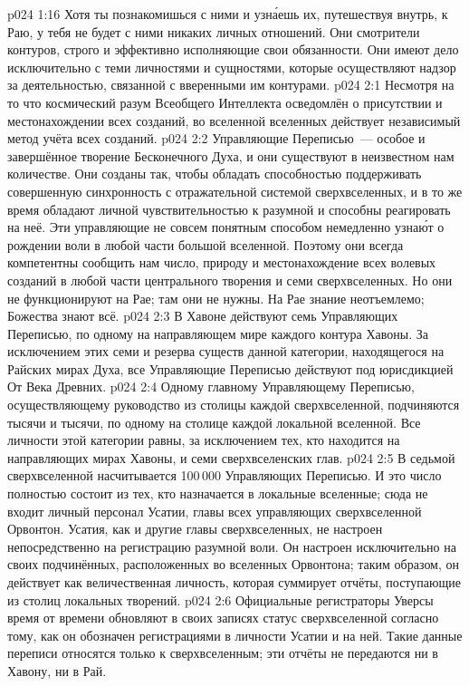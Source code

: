 \vs p024 1:16 Хотя ты познакомишься с ними и узн\'аешь их, путешествуя внутрь, к Раю, у тебя не будет с ними никаких личных отношений. Они смотрители контуров, строго и эффективно исполняющие свои обязанности. Они имеют дело исключительно с теми личностями и сущностями, которые осуществляют надзор за деятельностью, связанной с вверенными им контурами.
\vs p024 2:1 Несмотря на то что космический разум Всеобщего Интеллекта осведомлён о присутствии и местонахождении всех  созданий, во вселенной вселенных действует независимый метод учёта всех  созданий.
\vs p024 2:2 Управляющие Переписью~--- особое и завершённое творение Бесконечного Духа, и они существуют в неизвестном нам количестве. Они созданы так, чтобы обладать способностью поддерживать совершенную синхронность с отражательной системой сверхвселенных, и в то же время обладают личной чувствительностью к разумной  и способны реагировать на неё. Эти управляющие не совсем понятным способом немедленно узна\'ют о рождении воли в любой части большой вселенной. Поэтому они всегда компетентны сообщить нам число, природу и местонахождение всех волевых созданий в любой части центрального творения и семи сверхвселенных. Но они не функционируют на Рае; там они не нужны. На Рае знание неотъемлемо; Божества знают всё.
\vs p024 2:3 \pc В Хавоне действуют семь Управляющих Переписью, по одному на направляющем мире каждого контура Хавоны. За исключением этих семи и резерва существ данной категории, находящегося на Райских мирах Духа, все Управляющие Переписью действуют под юрисдикцией От Века Древних.
\vs p024 2:4 Одному главному Управляющему Переписью, осуществляющему руководство из столицы каждой сверхвселенной, подчиняются тысячи и тысячи, по одному на столице каждой локальной вселенной. Все личности этой категории равны, за исключением тех, кто находится на направляющих мирах Хавоны, и семи сверхвселенских глав.
\vs p024 2:5 В седьмой сверхвселенной насчитывается 100\,000 Управляющих Переписью. И это число полностью состоит из тех, кто назначается в локальные вселенные; сюда не входит личный персонал Усатии, главы всех управляющих сверхвселенной Орвонтон. Усатия, как и другие главы сверхвселенных, не настроен непосредственно на регистрацию разумной воли. Он настроен исключительно на своих подчинённых, расположенных во вселенных Орвонтона; таким образом, он действует как величественная личность, которая суммирует отчёты, поступающие из столиц локальных творений.
\vs p024 2:6 Официальные регистраторы Уверсы время от времени обновляют в своих записях статус сверхвселенной согласно тому, как он обозначен регистрациями в личности Усатии и на ней. Такие данные переписи относятся только к сверхвселенным; эти отчёты не передаются ни в Хавону, ни в Рай.
